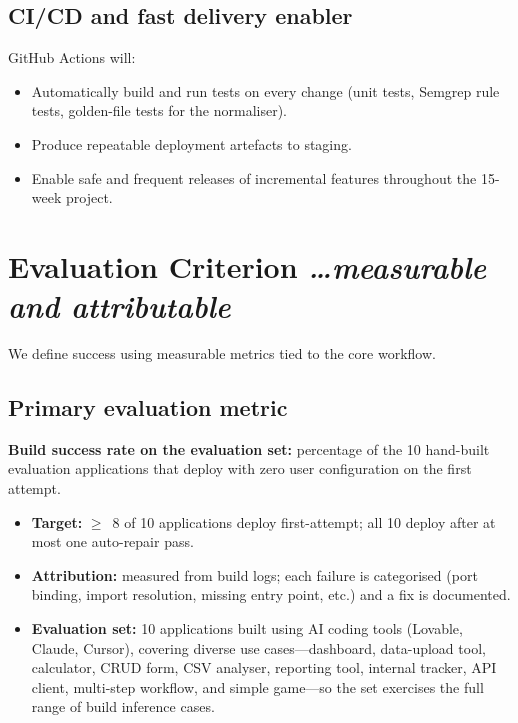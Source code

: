 \documentclass[11pt,a4paper]{article}
\newcommand{\BvrHint}[1]{%
{\normalfont\normalsize\itshape\hfill #1}}
\begin{document}
\subsection{CI/CD and fast delivery enabler}

GitHub Actions will:
\begin{itemize}[leftmargin=0.7cm]
  \item Automatically build and run tests on every change (unit tests, Semgrep rule
    tests, golden-file tests for the normaliser).
  \item Produce repeatable deployment artefacts to staging.
  \item Enable safe and frequent releases of incremental features throughout the
    15-week project.
\end{itemize}

\section{Evaluation Criterion %
\BvrHint{\ldots measurable and attributable}}

We define success using measurable metrics tied to the core workflow.

\subsection{Primary evaluation metric}

\textbf{Build success rate on the evaluation set:} percentage of the 10 hand-built
evaluation applications that deploy with zero user configuration on the first attempt.

\begin{itemize}[leftmargin=0.7cm]
  \item \textbf{Target:} $\geq$~8 of 10 applications deploy first-attempt;
    all 10 deploy after at most one auto-repair pass.
  \item \textbf{Attribution:} measured from build logs; each failure is categorised
    (port binding, import resolution, missing entry point, etc.) and a fix is
    documented.
  \item \textbf{Evaluation set:} 10 applications built using AI coding tools
    (Lovable, Claude, Cursor), covering diverse use cases---dashboard, data-upload
    tool, calculator, CRUD form, CSV analyser, reporting tool, internal tracker,
    API client, multi-step workflow, and simple game---so the set exercises the full
    range of build inference cases.
\end{itemize}
\end{document}
